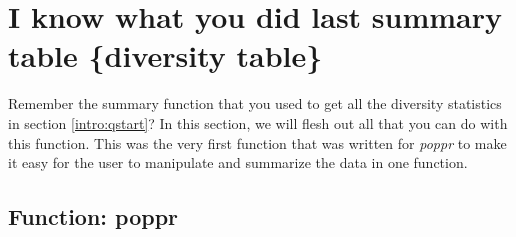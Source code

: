 \documentclass[letterpaper]{article}
\newcommand{\tab}{\hspace*{1em}}
\begin{document}
\section{I know what you did last summary table \{diversity table\}}\label{summary}

\tab\tab Remember the summary function that you used to get all the diversity statistics in section \ref{intro:qstart}? In this section, we will flesh out all that you can do with this function. This was the very first function that was written for \textit{poppr} to make it easy for the user to manipulate and summarize the data in one function.
\subsection{Function: poppr}\label{summary:poppr}
\end{document}
